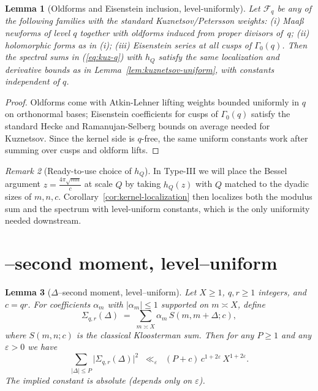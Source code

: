 \documentclass[11pt]{article}
\def\eqref#1{(\ref{#1})}%
\newtheorem{lemma}{Lemma}[part]
\theoremstyle{definition}
\theoremstyle{remark}
\newtheorem{remark}[lemma]{Remark}
\numberwithin{equation}{part}
\begin{document}
\begin{lemma}[Oldforms and Eisenstein inclusion, level-uniformly]\label{lem:old-eis-weights}
	Let $\mathcal F_q$ be any of the following families with the \emph{standard} Kuznetsov/Petersson weights: (i) Maaß newforms of level $q$ together with oldforms induced from proper divisors of~$q$; (ii) holomorphic forms as in (i); (iii) Eisenstein series at all cusps of $\Gamma_0(q)$. Then the spectral sums in \eqref{eq:kuz-q} with $h_Q$ satisfy the same localization and derivative bounds as in Lemma~\ref{lem:kuznetsov-uniform}, with constants independent of $q$.
\end{lemma}

\begin{proof}
	Oldforms come with Atkin-Lehner lifting weights bounded uniformly in $q$ on orthonormal bases; Eisenstein coefficients for cusps of $\Gamma_0(q)$ satisfy the standard Hecke and Ramanujan-Selberg bounds on average needed for Kuznetsov. Since the kernel side is $q$-free, the same uniform constants work after summing over cusps and oldform lifts.
\end{proof}

\begin{remark}[Ready-to-use choice of $h_Q$]\label{rem:choose-hQ}
	In Type-III we will place the Bessel argument $z=\tfrac{4\pi\sqrt{mn}}{c}$ at scale $Q$ by taking $h_Q(z)$ with $Q$ matched to the dyadic sizes of $m,n,c$. Corollary~\ref{cor:kernel-localization} then localizes both the modulus sum and the spectrum with level-uniform constants, which is the only uniformity needed downstream.
\end{remark}

\section{\textbf\textDelta--second moment, level--uniform}

\begin{lemma}[{\boldmath $\Delta$--second moment, level--uniform}]
	\label{lem:delta-second-moment}
	Let $X \ge 1$, $q,r \ge 1$ integers, and $c=qr$.
	For coefficients $\alpha_m$ with $|\alpha_m|\le 1$ supported on $m\asymp X$, define
	\[
		\Sigma_{q,r}(\Delta) \;=\; \sum_{m\asymp X} \alpha_m \, S(m,m+\Delta;c),
	\]
	where $S(m,n;c)$ is the classical Kloosterman sum. Then for any $P\ge 1$ and any $\varepsilon>0$ we have
	\[
		\sum_{|\Delta|\le P} \bigl|\Sigma_{q,r}(\Delta)\bigr|^2
		\;\;\ll_{\varepsilon}\;\; (P+c)\,c^{1+2\varepsilon}\,X^{1+2\varepsilon}.
	\]
	The implied constant is absolute (depends only on $\varepsilon$).
\end{lemma}
\end{document}

